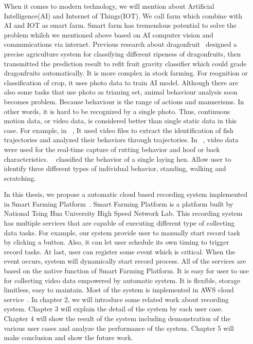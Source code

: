When it comes to modern technology, we will mention about Artificial Intelligence(AI) and Internet of Things(IOT). We call farm which combine with AI and IOT as smart farm. Smart farm has tremendous potential to solve the problem whilch we mentioned above based on AI computer vision and communications via internet. Previous research about dragonfruit~\cite{agri-ai} designed a precise agriculture system for classifying different ripeness of dragonfruits, then transmitted the prediction result to refit fruit gravity classifier which could grade dragonfruits automatically. It is more complex in stock farming. For reognition or classification of crop, it uses photo data to train AI model. Although there are also some tasks that use photo as trianing set, animal behaviour analysis soon becomes problem. Because behaviour is the range of actions and mannerisms. In other words, it is hard to be recognized by a single photo. Thus, continuous motion data, or video data, is considered better than single static data in this case. For example, in ~\cite{fish-paper}, It used video files to extract the identification of fish trajectories and analyzed their behaviors through trajectories. In ~\cite{cow-paper}, video data were used for the real-time capture of rutting behavior and hoof or back characteristics. ~\cite{hens-paper} classified the behavior of a single laying hen. Allow user to identify three different types of individual behavior, standing, walking and scratching.

In this thesis, we propose a automatic cloud based recording system implemented in Smart Farming Platform~\cite{agri-web}. Smart Farming Platform is a platform built by National Tsing Hua University High Speed Network Lab. This recording system has multiple services that are capable of executing different type of collecting data tasks. For example, our system provide user to manually start record task by clicking a button. Also, it can let user schedule its own timing to trigger record tasks. At last, user can register some event which is critical. When the event occurs, system will dynamically  start record process. All of the services are based on the native function of Smart Farming Platform. It is easy for user to use for collecting video data empowered by automatic system. It is flexible, storage limitless, easy to maintain. Most of the system is implemented in AWS cloud service~\cite{aws}. In chapter 2, we will introduce some related work about recording system. Chapter 3 will explain the detail of the system by each user case. Chapter 4 will show the result of the system including demonstration of the various user cases and analyze the performance of the system. Chapter 5 will make conclusion and show the future work.

